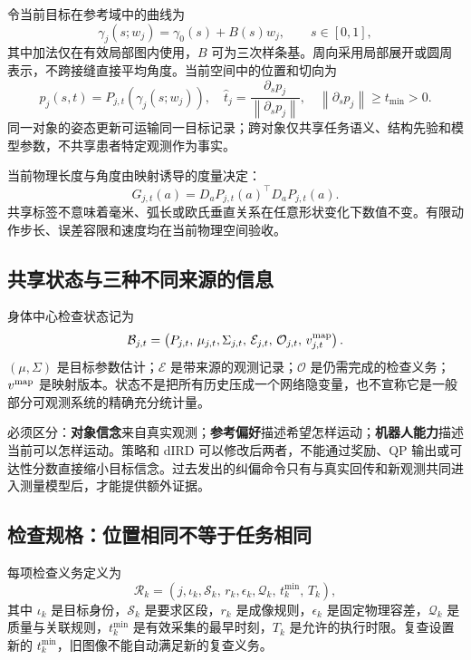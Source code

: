 \documentclass[UTF8,11pt,a4paper,fontset=fandol]{ctexart}
\numberwithin{equation}{section}
\theoremstyle{definition}
\newcommand{\norm}[1]{\left\lVert#1\right\rVert}
\begin{document}
令当前目标在参考域中的曲线为
\begin{equation}
\gamma_j(s;w_j)=\gamma_0(s)+B(s)w_j,\qquad s\in[0,1],
\label{eq:targetbasis}
\end{equation}
其中加法仅在有效局部图内使用，$B$ 可为三次样条基。周向采用局部展开或圆周表示，不跨接缝直接平均角度。当前空间中的位置和切向为
\begin{equation}
p_j(s,t)=P_{j,t}(\gamma_j(s;w_j)),\quad
\widehat t_j=\frac{\partial_s p_j}{\norm{\partial_s p_j}},
\quad \norm{\partial_s p_j}\ge t_{\min}>0.
\label{eq:targetworld}
\end{equation}
同一对象的姿态更新可运输同一目标记录；跨对象仅共享任务语义、结构先验和模型参数，不共享患者特定观测作为事实。

当前物理长度与角度由映射诱导的度量决定：
\begin{equation}
G_{j,t}(a)=D_aP_{j,t}(a)^\top D_aP_{j,t}(a).
\label{eq:metric}
\end{equation}
共享标签不意味着毫米、弧长或欧氏垂直关系在任意形状变化下数值不变。有限动作步长、误差容限和速度均在当前物理空间验收。

\subsection{共享状态与三种不同来源的信息}
身体中心检查状态记为
\begin{equation}
\mathcal B_{j,t}=\left(P_{j,t},\,\mu_{j,t},\Sigma_{j,t},\,
\mathcal E_{j,t},\,\mathcal O_{j,t},\,v_{j,t}^{\rm map}\right).
\label{eq:sharedstate}
\end{equation}
$(\mu,\Sigma)$ 是目标参数估计；$\mathcal E$ 是带来源的观测记录；$\mathcal O$ 是仍需完成的检查义务；$v^{\rm map}$ 是映射版本。状态不是把所有历史压成一个网络隐变量，也不宣称它是一般部分可观测系统的精确充分统计量。

必须区分：\textbf{对象信念}来自真实观测；\textbf{参考偏好}描述希望怎样运动；\textbf{机器人能力}描述当前可以怎样运动。策略和 dIRD 可以修改后两者，不能通过奖励、QP 输出或可达性分数直接缩小目标信念。过去发出的纠偏命令只有与真实回传和新观测共同进入测量模型后，才能提供额外证据。

\subsection{检查规格：位置相同不等于任务相同}
每项检查义务定义为
\begin{equation}
\mathcal R_k=(j,\iota_k,\mathcal S_k,\,r_k,\epsilon_k,
\mathcal Q_k,\,t_k^{\min},\,T_k),
\label{eq:task}
\end{equation}
其中 $\iota_k$ 是目标身份，$\mathcal S_k$ 是要求区段，$r_k$ 是成像规则，$\epsilon_k$ 是固定物理容差，$\mathcal Q_k$ 是质量与关联规则，$t_k^{\min}$ 是有效采集的最早时刻，$T_k$ 是允许的执行时限。复查设置新的 $t_k^{\min}$，旧图像不能自动满足新的复查义务。
\end{document}
